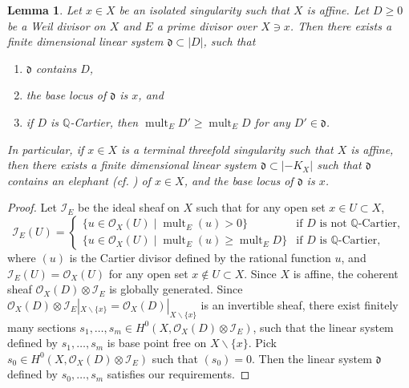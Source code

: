 \documentclass[11pt]{amsart}
\numberwithin{equation}{section}
\newcommand\luo[1]{\todo[color=red!40]{#1}} %
\newcommand{\Qq}{\mathbb{Q}}
\newcommand{\Supp}{\operatorname{Supp}}
\newcommand{\mult}{\operatorname{mult}}
\newtheorem{lem}[thm]{Lemma}
\theoremstyle{definition}
\theoremstyle{definition}
\begin{document}

\begin{lem}\label{lem: linear system base locus x}
Let $x\in X$ be an isolated singularity such that $X$ is affine. Let $D\geq 0$ be a Weil divisor on $X$ and $E$ a prime divisor over $X\ni x$. Then there exists a finite dimensional linear system ${{\mathfrak {d}}}\subset |D|$, such that
\begin{enumerate}
    \item ${{\mathfrak {d}}}$ contains $D$,
    \item the base locus of ${{\mathfrak {d}}}$ is $x$, and
    \item if $D$ is $\Qq$-Cartier, then $\mult_E D'\geq \mult_E D$ for any $D'\in \mathfrak{d}$.
\end{enumerate}
In particular, if $x\in X$ is a terminal threefold singularity such that $X$ is affine, then there exists a finite dimensional linear system $\mathfrak{d}\subset |-K_X|$ such that $\mathfrak{d}$ contains an elephant (cf. \cite[(6.4)(B)]{Rei87}) of $x\in X$, and the base locus of ${{\mathfrak {d}}}$ is $x$.
\end{lem}
\begin{proof}
Let $\mathcal{I}_{E}$ be the ideal sheaf on $X$ such that for any open set $x\in U\subset X$,
$$\mathcal{I}_{E}(U)=\begin{cases}\{u\in \mathcal{O}_X(U)\mid \mult_E (u)>0\}& \text{if $D$ is not $\Qq$-Cartier},\\
\{u\in \mathcal{O}_X(U)\mid \mult_E (u)\geq \mult_ED\} & \text{if $D$ is $\Qq$-Cartier},
\end{cases}$$
where $(u)$ is the Cartier divisor defined by the rational function $u$, and $\mathcal{I}_E(U)=\mathcal{O}_X(U)$ for any open set $x\notin U\subset X$. Since $X$ is affine, the coherent sheaf $\mathcal{O}_X(D)\otimes \mathcal{I}_{E}$ is globally generated. Since $\mathcal{O}_X(D)\otimes \mathcal{I}_{E}|_{X\backslash\{x\}}=\mathcal{O}_X(D)|_{X\backslash\{x\}}$ is an invertible sheaf, there exist finitely many sections $s_1,\ldots,s_m\in H^0(X,\mathcal{O}_X(D)\otimes \mathcal{I}_{E})$, such that the linear system defined by $s_1,\ldots,s_m$ is base point free on $X\backslash\{x\}$. Pick $s_0\in H^0(X,\mathcal{O}_X(D)\otimes \mathcal{I}_{E})$ such that $(s_0)=0$. Then the linear system ${{\mathfrak {d}}}$ defined by $s_0,\ldots,s_m$ satisfies our requirements.
\end{proof}
\end{document}
